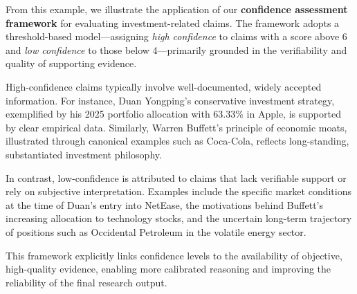 \documentclass[11pt]{article}
\begin{document}
From this example, we illustrate the application of our \textbf{confidence assessment framework} for evaluating investment-related claims. The framework adopts a threshold-based model—assigning \textit{high confidence} to claims with a score above 6 and \textit{low confidence} to those below 4—primarily grounded in the verifiability and quality of supporting evidence.

High-confidence claims typically involve well-documented, widely accepted information. For instance, Duan Yongping's conservative investment strategy, exemplified by his 2025 portfolio allocation with 63.33\% in Apple, is supported by clear empirical data. Similarly, Warren Buffett's principle of economic moats, illustrated through canonical examples such as Coca-Cola, reflects long-standing, substantiated investment philosophy.

In contrast, low-confidence is attributed to claims that lack verifiable support or rely on subjective interpretation. Examples include the specific market conditions at the time of Duan’s entry into NetEase, the motivations behind Buffett’s increasing allocation to technology stocks, and the uncertain long-term trajectory of positions such as Occidental Petroleum in the volatile energy sector.

This framework explicitly links confidence levels to the availability of objective, high-quality evidence, enabling more calibrated reasoning and improving the reliability of the final research output.

\begin{tcolorbox}[title = {Perplexity's Report}, fontupper=\footnotesize, fontlower=\Large, breakable]
% 

\end{tcolorbox}

\begin{tcolorbox}[title = {Doubao's Report}, fontupper=\footnotesize, fontlower=\Large, breakable]
% 

\end{tcolorbox}
\end{document}
